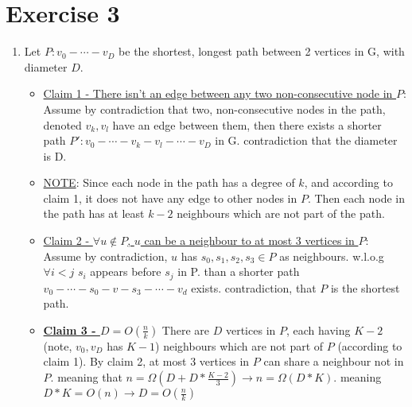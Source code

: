 \documentclass[11pt]{article}
\begin{document}
\section*{Exercise 3}
\begin{enumerate}
    \item 
    Let $P: v_0 - \cdots - v_D$ be the shortest, longest path between 2 vertices in G, with diameter $D$.
    \begin{itemize}
        \item \underline{Claim 1 - There isn't an edge between any two non-consecutive node in $P$}:
        \newline
        Assume by contradiction that two, non-consecutive nodes in the path, denoted $v_k, v_l$ have an edge between them, then there exists a shorter path $P': v_0 - \cdots - v_k - v_l -\cdots - v_D$ in G. contradiction that the diameter is D. 
        \item \underline{NOTE}: Since each node in the path has a degree of $k$, and according to claim 1, it does not have any edge to other nodes in $P$. Then each node in the path has at least $k-2$ neighbours which are not part of the path.
        
        \item \underline{Claim 2 - ${ \forall u \notin P}$, $u$ can be a neighbour to at most 3 vertices in $P$}:
        Assume by contradiction, $ u $ has ${s_0, s_1, s_2, s_3 \in P}$ as neighbours. w.l.o.g  ${ \forall i < j}$ ${s_i}$ appears before $ s_j $ in P. than a shorter path $ v_0 - \cdots - s_0 - v - s_3 - \cdots - v_d$ exists. contradiction, that $P$ is the shortest path.
        
        \item\underline{\textbf{Claim 3 - $D =O(\frac{n}{k})$}}
        There are $D$ vertices in $P$, each having $K-2$ (note, $v_0, v_D$ has $K-1$) neighbours which are not part of $P$ (according to claim 1). By claim 2, at most 3 vertices in $P$ can share a neighbour not in $P$. meaning that $n = \Omega(D + D*\frac{K-2}{3}) \rightarrow  n = \Omega (D*K)$. meaning $D*K = O(n) \rightarrow D = O(\frac{n}{k})$
        



\end{itemize}
\end{enumerate}
\end{document}
